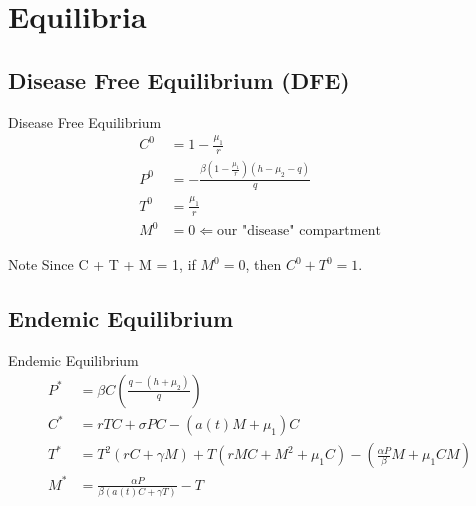 \documentclass{beamer}
\begin{document}
\section{Equilibria}
\subsection{Disease Free Equilibrium (DFE)}
\begin{frame}{Disease Free Equilibrium}
    \begin{align*}
        C^{0} &= 1 - \frac{\mu_{1}}{r}\\
        P^{0} &= -\frac{\beta(1 - \frac{\mu_{1}}{r})(h - \mu_{2} - q)}{q}\\
        T^{0} &= \frac{\mu_{1}}{r}\\
        M^{0} &= 0 \Longleftarrow \text{our "disease" compartment}
    \end{align*}
    \begin{block}{Note}
    Since C + T + M = 1, if $M^{0} = 0$, then $C^{0} + T^{0} = 1$.
    \end{block}
\end{frame}

\subsection{Endemic Equilibrium}
\begin{frame}{Endemic Equilibrium}
    \begin{align*}
        P^{*} &= \beta C \left(\frac{q-(h+\mu_{2})}{q} \right)\\
        C^{*} &= rTC + \sigma PC- (a(t)M+\mu_{1})C\\
        T^{*} &= T^{2}(rC + \gamma M) + T(rMC + M^{2}+\mu_{1}C) - \left(\frac{\alpha P}{\beta}M + \mu_{1}CM \right)\\
        M^{*} &= \frac{\alpha P}{\beta(a(t)C+\gamma T)} - T
    \end{align*}
\end{frame}
\end{document}
